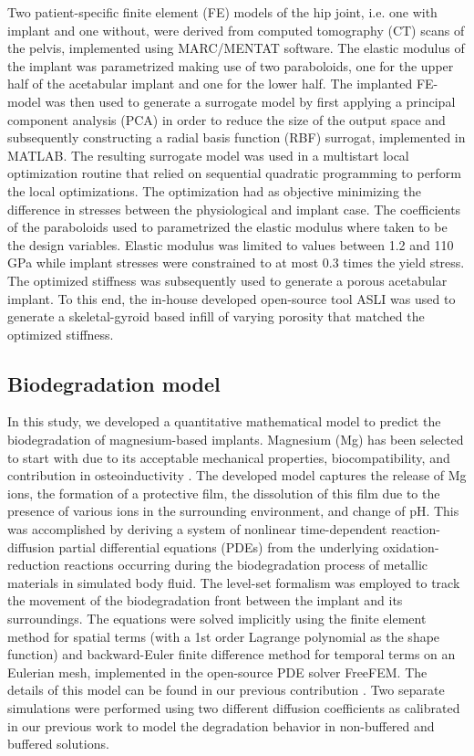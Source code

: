 Two patient-specific finite element (FE) models of the hip joint, i.e. one with implant and one without, were derived from computed tomography (CT) scans of the pelvis, implemented using MARC/MENTAT software. The elastic modulus of the implant was parametrized making use of two paraboloids, one for the upper half of the acetabular implant and one for the lower half. The implanted FE-model was then used to generate a surrogate model by first applying a principal component analysis (PCA) in order to reduce the size of the output space and subsequently constructing a radial basis function (RBF) surrogat, implemented in MATLAB. The resulting surrogate model was used in a multistart local optimization routine that relied on sequential quadratic programming to perform the local optimizations. The optimization had as objective minimizing the difference in stresses between the physiological and implant case. The coefficients of the paraboloids used to parametrized the elastic modulus where taken to be the design variables.  Elastic modulus was limited to values between 1.2 and 110 GPa while implant stresses were constrained to at most 0.3 times the yield stress. The optimized stiffness was subsequently used to generate a porous acetabular implant. To this end, the in-house developed open-source tool ASLI \cite{Perez-Boerema2022} was used to generate a skeletal-gyroid based infill of varying porosity that matched the optimized stiffness.

\subsection{Biodegradation model}




In this study, we developed a quantitative mathematical model to predict the biodegradation of magnesium-based implants. Magnesium (Mg) has been selected to start with due to its acceptable mechanical properties, biocompatibility, and contribution in osteoinductivity \cite{Agarwal2016}. The developed model captures the release of Mg ions, the formation of a protective film,  the dissolution of this film due to the presence of various ions in the surrounding environment, and change of pH. This was accomplished by deriving a system of nonlinear time-dependent reaction-diffusion partial differential equations (PDEs) from the underlying oxidation-reduction reactions occurring during the biodegradation process of metallic materials in simulated body fluid. The level-set formalism was employed to track the movement of the biodegradation front between the implant and its surroundings. The equations were solved implicitly using the finite element method for spatial terms (with a 1st order Lagrange polynomial as the shape function) and backward-Euler finite difference method for temporal terms on an Eulerian mesh, implemented in the open-source PDE solver FreeFEM\cite{Hecht2012}. The details of this model can be found in our previous contribution \cite{Barzegari2021}. Two separate simulations were performed using two different diffusion coefficients as calibrated in our previous work to model the degradation behavior in non-buffered and buffered solutions.

